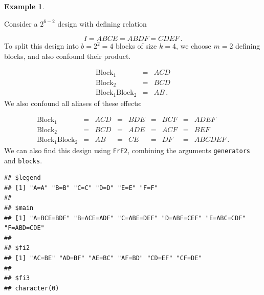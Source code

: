 \documentclass[
]{book}
\newenvironment{Shaded}{\begin{snugshade}}{\end{snugshade}}
\newcommand{\AttributeTok}[1]{\textcolor[rgb]{0.77,0.63,0.00}{#1}}
\newcommand{\DecValTok}[1]{\textcolor[rgb]{0.00,0.00,0.81}{#1}}
\newcommand{\FloatTok}[1]{\textcolor[rgb]{0.00,0.00,0.81}{#1}}
\newcommand{\FunctionTok}[1]{\textcolor[rgb]{0.00,0.00,0.00}{#1}}
\newcommand{\NormalTok}[1]{#1}
\newcommand{\OtherTok}[1]{\textcolor[rgb]{0.56,0.35,0.01}{#1}}
\newcommand{\SpecialCharTok}[1]{\textcolor[rgb]{0.00,0.00,0.00}{#1}}
\newcommand{\StringTok}[1]{\textcolor[rgb]{0.31,0.60,0.02}{#1}}
\theoremstyle{definition}
\theoremstyle{definition}
\newtheorem{example}{Example}[chapter]
\theoremstyle{definition}
\theoremstyle{definition}
\theoremstyle{remark}
\begin{document}
\begin{example}
\protect\hypertarget{exm:block-fractional}{}\label{exm:block-fractional}

Consider a \(2^{6-2}\) design with defining relation

\[
I = ABCE = ABDF = CDEF\,.
\]
To split this design into \(b=2^2 = 4\) blocks of size \(k=4\), we choose \(m=2\) defining blocks, and also confound their product.

\[
\begin{array}{ccc}
\mathrm{Block}_1 & = & ACD \\
\mathrm{Block}_2 & = & BCD \\
\mathrm{Block}_1\mathrm{Block}_2 & = & AB\,.
\end{array}
\]
We also confound all aliases of these effects:

\[
\begin{array}{ccccccccc}
\mathrm{Block}_1 & = & ACD & = & BDE & = & BCF & = & ADEF \\
\mathrm{Block}_2 & = & BCD & = & ADE & = & ACF & = & BEF \\
\mathrm{Block}_1\mathrm{Block}_2 & = & AB & = & CE & = & DF & = & ABCDEF \,.
\end{array}
\]
We can also find this design using \texttt{FrF2}, combining the arguments \texttt{generators} and \texttt{blocks}.

\begin{Shaded}
\end{Shaded}

\begin{verbatim}
## $legend
## [1] "A=A" "B=B" "C=C" "D=D" "E=E" "F=F"
## 
## $main
## [1] "A=BCE=BDF" "B=ACE=ADF" "C=ABE=DEF" "D=ABF=CEF" "E=ABC=CDF" "F=ABD=CDE"
## 
## $fi2
## [1] "AC=BE" "AD=BF" "AE=BC" "AF=BD" "CD=EF" "CF=DE"
## 
## $fi3
## character(0)
\end{verbatim}


\end{example}
\end{document}
